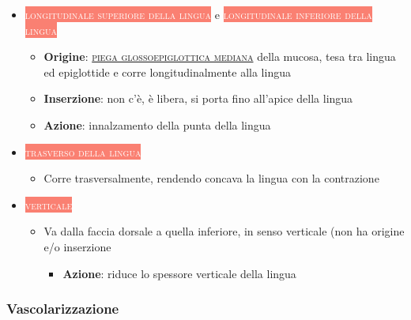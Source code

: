 \documentclass[italian,]{article}
\providecommand{\tightlist}{%
  \setlength{\itemsep}{0pt}\setlength{\parskip}{0pt}}
\newcommand{\mus}[1]{\colorbox{Salmon}{\textcolor{white}{\textsc{#1}}}}
\renewcommand{\a}[1]{\underline{\textsc{#1}}}
\begin{document}
\begin{itemize}
\item
  \mus{longitudinale superiore della lingua} e
  \mus{longitudinale inferiore della lingua}~

  \begin{itemize}
  \tightlist
  \item
    \textbf{Origine}: \a{piega glossoepiglottica mediana} della mucosa,
    tesa tra lingua ed epiglottide e corre longitudinalmente alla lingua
  \item
    \textbf{Inserzione}: non c'è, è libera, si porta fino all'apice
    della lingua
  \item
    \textbf{Azione}: innalzamento della punta della lingua
  \end{itemize}
\item
  \mus{trasverso della lingua}~

  \begin{itemize}
  \tightlist
  \item
    Corre trasversalmente, rendendo concava la lingua con la contrazione
  \end{itemize}
\item
  \mus{verticale}

  \begin{itemize}
  \tightlist
  \item
    Va dalla faccia dorsale a quella inferiore, in senso verticale (non
    ha origine e/o inserzione

    \begin{itemize}
    \tightlist
    \item
      \textbf{Azione}: riduce lo spessore verticale della lingua
    \end{itemize}
  \end{itemize}
\end{itemize}

\hypertarget{vascolarizzazione}{%
\subsubsection{Vascolarizzazione}\label{vascolarizzazione}}
\end{document}
